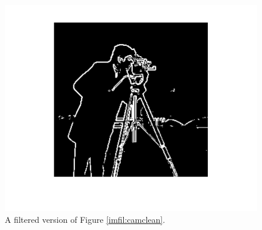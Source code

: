 \begin{figure}[h!]
\includegraphics{edges.pdf}
\caption{A filtered version of Figure \ref{imfil:camclean}.}
\label{imfil:edges}
\end{figure}
